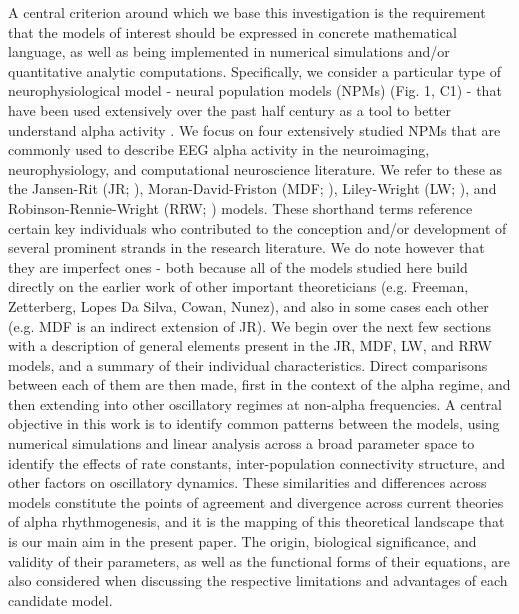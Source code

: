 \documentclass[12pt,twoside]{article}
\begin{document}
A central criterion around which we base this investigation is the requirement that the models of interest should be expressed in concrete mathematical language, as well as being implemented in numerical simulations and/or quantitative analytic computations. Specifically, we consider a particular type of neurophysiological model - neural population models (NPMs) (Fig. 1, C1) -  that have been used extensively over the past half century as a tool to better understand alpha activity  \citep{da1977cortical,grimbert2006bifurcation,jansen1995electroencephalogram,liley2001spatially,bhattacharya2011thalamo,david2003neural,hartoyo2019parameter,robinson2003neurophysical}. 
We focus on four extensively studied NPMs that are commonly used to describe EEG alpha activity in the neuroimaging, neurophysiology, and computational neuroscience literature. We refer to these as the Jansen-Rit (JR; \citealt{jansen1995electroencephalogram}), Moran-David-Friston (MDF; \citealt{david2003neural, moran2007neural}), Liley-Wright (LW;  \citealt{liley1999continuum, liley2001spatially}), and Robinson-Rennie-Wright (RRW; \citealt{robinson2002dynamics, robinson2003neurophysical}) models. These shorthand terms reference certain key individuals who contributed to the conception and/or development of several prominent strands in the research literature. We do note however that they are imperfect ones - both because all of the models studied here build directly on the earlier work of other important theoreticians (e.g. Freeman, Zetterberg, Lopes Da Silva, Cowan, Nunez), and also in some cases each other (e.g. MDF is an indirect extension of JR). 
We begin over the next few sections with a description of general elements present in the JR, MDF, LW, and RRW models, and a summary of their individual  characteristics. Direct comparisons between each of them are then made, first in the context of the alpha regime, and then extending into other oscillatory regimes at non-alpha frequencies.
A central objective in this work is to identify common patterns between the models, using numerical simulations and linear analysis across a broad parameter space to identify the effects of rate constants, inter-population connectivity structure, and other factors on oscillatory dynamics. These similarities and differences across models constitute the points of agreement and divergence across current theories of alpha rhythmogenesis, and it is the mapping of this theoretical landscape that is our main aim in the present paper. The origin, biological significance, and validity of their parameters, as well as the functional forms of their equations, are also considered when discussing the respective limitations and advantages of each candidate model. 
 \
\end{document}
